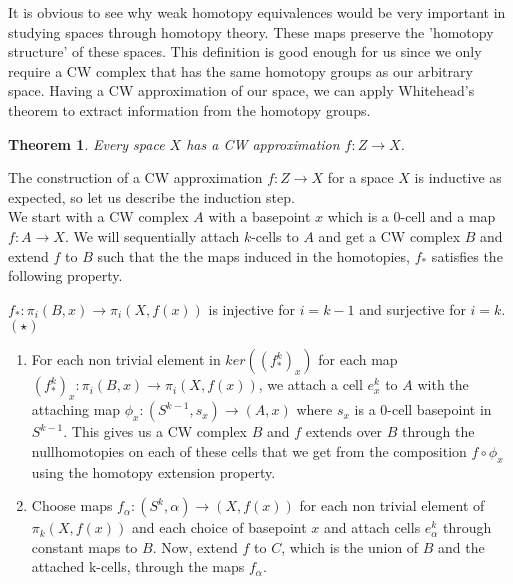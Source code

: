 \documentclass[12pt]{extarticle}
\numberwithin{equation}{section}
\newtheorem{thm}{Theorem}[section]
\begin{document}
It is obvious to see why weak homotopy equivalences would be very important in studying spaces through homotopy theory. These maps preserve the 'homotopy structure' of these spaces. This definition is good enough for us since we only require a CW complex that has the same homotopy groups as our arbitrary space. Having a CW approximation of our space, we can apply Whitehead's theorem to extract information from the homotopy groups.\\

\begin{thm}
Every space $X$ has a CW approximation $f :Z\to X$.
\end{thm}

The construction of a CW approximation $f :Z\to X$ for a space $X$ is inductive as expected,
so let us describe the induction step.\\

We start with a CW complex $A$ with a basepoint $x$ which is a 0-cell and a map $f:A\to X$. We will sequentially attach $k$-cells to $A$ and get a CW complex $B$ and extend $f$ to $B$ such that the the maps induced in the homotopies, $f_*$ satisfies the following property.\\

\begin{center}
    $f_*:\pi_i(B,x)\to \pi_i(X,f(x))$ is injective for $i=k-1$ and surjective for $i=k$.           $(\star)$\\
\end{center}

\begin{enumerate}
    \item For each non trivial element in $ker((f_*^k)_x)$ for each map ${(f_*^k)_x}:\pi_i(B,x)\to \pi_i(X,f(x))$, we attach a cell $e^k_x$ to $A$ with the attaching map $\phi_x:(S^{k-1},s_x)\to (A,x)$ where $s_x$ is a 0-cell basepoint in $S^{k-1}$. This gives us a CW complex $B$ and $f$ extends over $B$ through the nullhomotopies on each of these cells that we get from the composition $f\circ \phi_x$ using the homotopy extension property.\\
    
    \item Choose maps $f_\alpha :(S^k,\alpha)\to (X,f(x))$ for each non trivial element of $\pi_k(X,f(x))$ and each choice of basepoint $x$ and attach cells $e^k_\alpha$ through constant maps to $B$. Now, extend $f$ to $C$, which is the union of $B$ and the attached k-cells, through the maps $f_\alpha$.
\end{enumerate}
\end{document}
